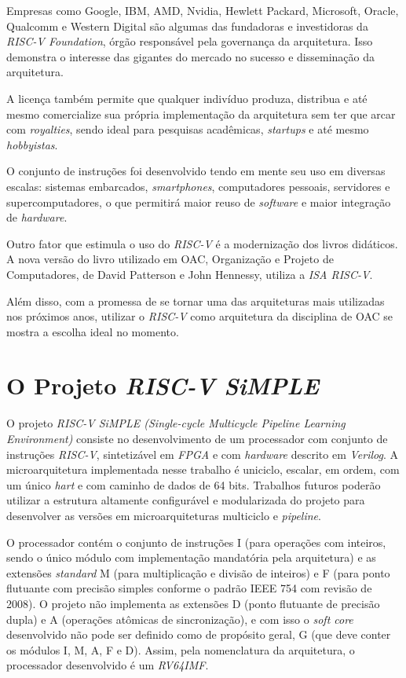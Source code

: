     {Empresas como Google, IBM, AMD, Nvidia, Hewlett Packard, Microsoft, Oracle, Qualcomm e Western Digital são algumas das fundadoras e investidoras da \textit{RISC-V Foundation}, órgão responsável pela governança da arquitetura. Isso demonstra o interesse das gigantes do mercado no sucesso e disseminação da arquitetura.}

    {A licença também permite que qualquer indivíduo produza, distribua e até mesmo comercialize sua própria implementação da arquitetura sem ter que arcar com \textit{royalties}, sendo ideal para pesquisas acadêmicas, \textit{startups} e até mesmo \textit{hobbyistas}.}

    {O conjunto de instruções foi desenvolvido tendo em mente seu uso em diversas escalas: sistemas embarcados, \textit{smartphones}, computadores pessoais, servidores e supercomputadores, o que permitirá maior reuso de \textit{software} e maior integração de \textit{hardware}.}

    {Outro fator que estimula o uso do \textit{RISC-V} é a modernização dos livros didáticos. A nova versão do livro utilizado em OAC, Organização e Projeto de Computadores, de David Patterson e John Hennessy, utiliza a \textit{ISA RISC-V}.}

    {Além disso, com a promessa de se tornar uma das arquiteturas mais utilizadas nos próximos anos, utilizar o \textit{RISC-V} como arquitetura da disciplina de OAC se mostra a escolha ideal no momento.}


\section{O Projeto \textit{RISC-V SiMPLE}}

    {O projeto \textit{RISC-V SiMPLE (Single-cycle Multicycle Pipeline Learning Environment)} consiste no desenvolvimento de um processador com conjunto de instruções \textit{RISC-V}, sintetizável em \textit{FPGA} e com \textit{hardware} descrito em \textit{Verilog}. A microarquitetura implementada nesse trabalho é uniciclo, escalar, em ordem, com um único \textit{hart} e com caminho de dados de 64 bits. Trabalhos futuros poderão utilizar a estrutura altamente configurável e modularizada do projeto para desenvolver as versões em microarquiteturas multiciclo e \textit{pipeline}.}

    {O processador contém o conjunto de instruções I (para operações com inteiros, sendo o único módulo com implementação mandatória pela arquitetura) e as extensões \textit{standard} M (para multiplicação e divisão de inteiros) e F (para ponto flutuante com precisão simples conforme o padrão IEEE 754 com revisão de 2008). O projeto não implementa as extensões D (ponto flutuante de precisão dupla) e A (operações atômicas de sincronização), e com isso o \textit{soft core} desenvolvido não pode ser definido como de propósito geral, G (que deve conter os módulos I, M, A, F e D). Assim, pela nomenclatura da arquitetura, o processador desenvolvido é um \textit{RV64IMF}.}

